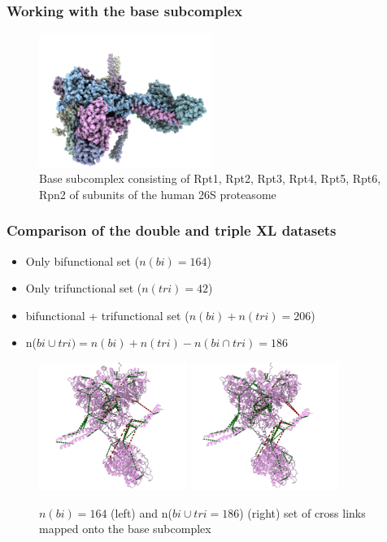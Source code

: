 \documentclass[a4paper,8pt]{beamer}
\begin{document}
%
\begin{frame}
    \frametitle{Working with the base subcomplex}
\begin{figure}
\centering
\includegraphics[width=0.5\textwidth]{figures/base_proteasome_5gjr.png}
\caption{Base subcomplex consisting of Rpt1, Rpt2, Rpt3, Rpt4, Rpt5, Rpt6, Rpn2 of subunits 
of the human 26S proteasome}
  \end{figure}
\end{frame}
%
\begin{frame}
\frametitle{Comparison of the double and triple XL datasets}
\begin{block}{}
\begin{itemize}
  \item Only bifunctional set ($n(bi) = 164$)
  \item Only trifunctional set ($n(tri)= 42$)
  \item bifunctional + trifunctional set ($n(bi) + n(tri) = 206$)
  \item n($bi \cup tri) = n(bi) + n(tri) - n(bi\cap tri) = 186$
\end{itemize}
\end{block}
    \begin{figure}
      \centering
      \includegraphics[width=0.43\textwidth]{figures/only-doubles.png}
      \includegraphics[width=0.43\textwidth]{figures/removed-doubles-plus-triples.png}
      \caption{$n(bi) = 164$ (left) and n($bi \cup tri = 186$) (right) set of cross links mapped onto the base subcomplex}
    \end{figure}
\end{frame}
\end{document}
